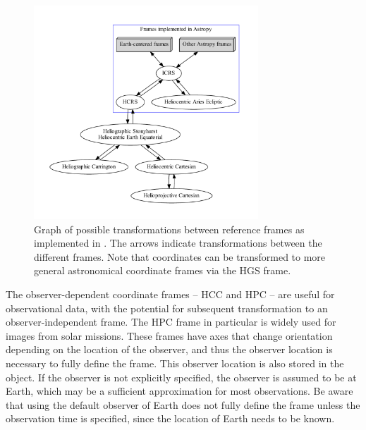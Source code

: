 \begin{figure}
    \centering
    \includegraphics[width=0.75\textwidth]{figures/sunpy_frames.pdf}
    \caption{Graph of possible transformations between reference frames as implemented in .
    The arrows indicate transformations between the different frames.
    Note that coordinates can be transformed to more general astronomical coordinate frames via the HGS frame.}
    \label{fig:transform_graph}
\end{figure}

The observer-dependent coordinate frames -- HCC and HPC -- are useful for observational data, with the potential for subsequent transformation to an observer-independent frame.
The HPC frame in particular is widely used for images from solar missions.
These frames have axes that change orientation depending on the location of the observer, and thus the observer location is necessary to fully define the frame.
This observer location is also stored in the  object.
If the observer is not explicitly specified, the observer is assumed to be at Earth, which may be a sufficient approximation for most observations.
Be aware that using the default observer of Earth does not fully define the frame unless the observation time is specified, since the location of Earth needs to be known.

